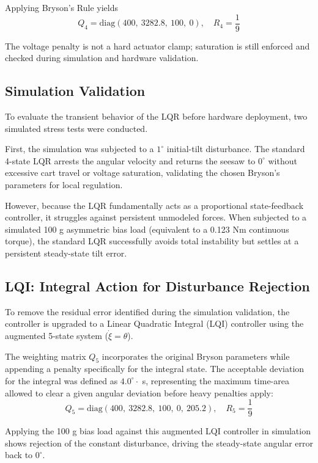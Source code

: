 \documentclass[11pt,a4paper]{article}
\begin{document}
Applying Bryson's Rule yields
\begin{equation}
Q_4 = \text{diag}\left(400,\ 3282.8,\ 100,\ 0\right), \quad R_4 = \frac{1}{9}
\end{equation}

The voltage penalty is not a hard actuator clamp; saturation is still enforced and checked during simulation and hardware validation.

\subsection{Simulation Validation}
To evaluate the transient behavior of the LQR before hardware deployment, two simulated stress tests were conducted.

First, the simulation was subjected to a $1^\circ$ initial-tilt disturbance. The standard 4-state LQR arrests the angular velocity and returns the seesaw to $0^\circ$ without excessive cart travel or voltage saturation, validating the chosen Bryson's parameters for local regulation.

However, because the LQR fundamentally acts as a proportional state-feedback controller, it struggles against persistent unmodeled forces. When subjected to a simulated 100 g asymmetric bias load (equivalent to a 0.123 Nm continuous torque), the standard LQR successfully avoids total instability but settles at a persistent steady-state tilt error.

\subsection{LQI: Integral Action for Disturbance Rejection}
To remove the residual error identified during the simulation validation, the controller is upgraded to a Linear Quadratic Integral (LQI) controller using the augmented 5-state system ($\dot{\xi} = \theta$).

The weighting matrix $Q_5$ incorporates the original Bryson parameters while appending a penalty specifically for the integral state. The acceptable deviation for the integral was defined as $4.0^\circ \cdot$ s, representing the maximum time-area allowed to clear a given angular deviation before heavy penalties apply:
\begin{equation}
Q_5 = \text{diag}\left(400,\ 3282.8,\ 100,\ 0,\ 205.2\right), \quad R_5 = \frac{1}{9}
\end{equation}

Applying the 100 g bias load against this augmented LQI controller in simulation shows rejection of the constant disturbance, driving the steady-state angular error back to $0^\circ$.
\end{document}
